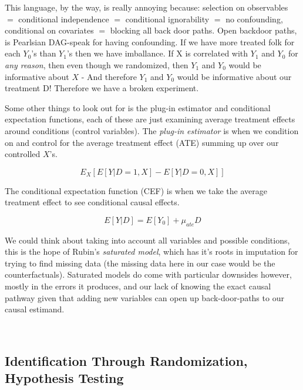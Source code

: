 \documentclass[12pt]{article}\usepackage[]{graphicx}\usepackage[]{color}
\begin{document}
\begin{flushleft}
This language, by the way, is really annoying because: selection on observables $=$ conditional independence $=$ conditional ignorability $=$ no confounding, conditional on covariates $=$ blocking all back door paths.    Open backdoor paths, is Pearlsian DAG-speak for having confounding. If we have more treated folk for each $Y_0$'s than $Y_1$'s then we have imballance. If X is correlated with $Y_1$ and $Y_0$ for \textit{any reason}, then even though we randomized, then $Y_1$ and $Y_0$ would be informative about $X$ - And therefore $Y_1$ and $Y_0$ would be informative about our treatment D! Therefore we have a broken experiment.

Some other things to look out for is the plug-in estimator and conditional expectation functions, each of these are just examining average treatment effects around conditions (control variables). The \textit{plug-in estimator} is when we condition on and control for the average treatment effect (ATE) summing up over our controlled $X$'s.

\begin{equation}
E_X[E[Y |  D = 1, X] − E[Y |D = 0,X]]
\end{equation}

\noindent The conditional expectation function (CEF) is when we take the average treatment effect to see conditional causal effects.

\begin{equation}
E[Y |D] = E[Y_0] + \mu_{ate}D
\end{equation}

We could think about taking into account all variables and possible conditions, this is the hope of Rubin's \textit{saturated model}, which has it's roots in imputation for trying to find missing data (the missing data here in our case would be the counterfactuals). Saturated models do come with particular downsides however, mostly in the errors it produces, and our lack of knowing the exact causal pathway given that adding new variables can open up back-door-paths to our causal estimand.  


\hfill \\

\subsection{Identification Through Randomization, Hypothesis Testing}


\end{flushleft}
\end{document}
